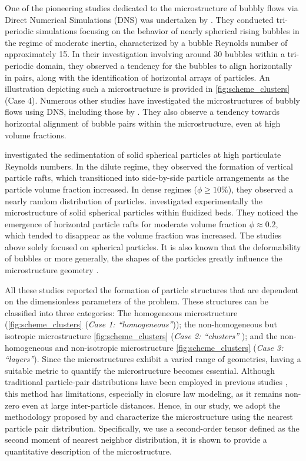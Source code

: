 \documentclass[11pt]{My_preprint}
\begin{document}
One of the pioneering studies dedicated to the microstructure of bubbly flows via Direct Numerical Simulations (DNS) was undertaken by \citet{bunner2002dynamics}.
They conducted tri-periodic simulations focusing on the behavior of nearly spherical rising bubbles in the regime of moderate inertia, characterized by a bubble Reynolds number of approximately 15.
In their investigation involving around 30 bubbles within a tri-periodic domain, they observed a tendency for the bubbles to align horizontally in pairs, along with the identification of horizontal arrays of particles.
An illustration depicting such a microstructure is provided in \ref{fig:scheme_clusters} (Case 4).
Numerous other studies have investigated the microstructures of bubbly flows using DNS, including those by \citet{yin2008lattice,zhang2021direct}. 
They also observe a tendency towards horizontal alignment of bubble pairs within the microstructure, even at high volume fractions. 

\citet{shajahan2023inertial} investigated the sedimentation of solid spherical particles at high particulate Reynolds numbers.
In the dilute regime, they observed the formation of vertical particle rafts, which transitioned into side-by-side particle arrangements as the particle volume fraction increased. In dense regimes ($\phi \geq 10 \%$), they observed a nearly random distribution of particles. \citet{almeras2021statistics} investigated experimentally the microstructure of solid spherical particles within fluidized beds. They noticed the emergence of horizontal particle rafts for moderate volume fraction $\phi \approx 0.2$, which tended to disappear as the volume fraction was increased.  The studies above solely focused on spherical particles.
It is also known that the deformability of bubbles or more generally, the shapes of the particles greatly influence the microstructure geometry \citep{bunner2003effect,seyed2021sedimentation}.

All these studies reported the formation of particle structures that are dependent on the dimensionless parameters of the problem.
These structures can be classified into three categories: The homogeneous microstructure (\ref{fig:scheme_clusters} (\textit{Case 1: ``homogeneous''})); the non-homogeneous but isotropic microstructure \ref{fig:scheme_clusters} (\textit{Case 2: ``clusters'' }); and the non-homogeneous and non-isotropic microstructure \ref{fig:scheme_clusters} (\textit{Case 3: ``layers''}).
Since the microstructures exhibit a varied range of geometries, having a suitable metric to quantify the microstructure becomes essential. 
Although traditional particle-pair distributions have been employed in previous studies \citep{yin2007,cartellier2009induced, seyed2021sedimentation}, this method has limitations, especially in closure law modeling, as it remains non-zero even at large inter-particle distances. 
Hence, in our study, we adopt the methodology proposed by \citep{zhang2023evolution} and characterize the microstructure using the nearest particle pair distribution.
Specifically, we use a second-order tensor defined as the second moment of nearest neighbor distribution, it is shown to provide a quantitative description of the microstructure.
\end{document}
